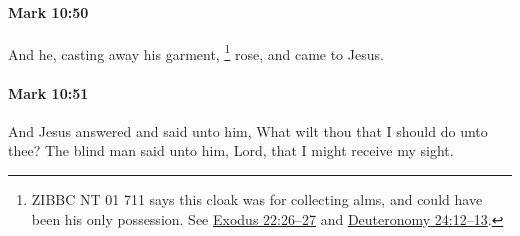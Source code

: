 		\paragraph{Mark 10:50} %
			\label{MARK-10-50}

			And he, casting away his garment,%
				\footnote{%
					ZIBBC NT 01 711 says this cloak was for collecting alms, and could have been his only possession. See \hyperref[EXODUS-22-26]{Exodus 22:26--27} and \hyperref[DEUTERONOMY-24-12]{Deuteronomy 24:12--13}.
					}
			rose, and came to Jesus.

			\begin{framed}
			\scriptsize
				\begin{compactdesc}
					\item[SBLG] 
				\end{compactdesc}
			\end{framed}

		\paragraph{Mark 10:51} %
			\label{MARK-10-51}

			And Jesus answered and said unto him, What wilt thou that I should do unto thee? The blind man said unto him, Lord, that I might receive my sight.

